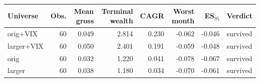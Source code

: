\begin{tabular}{lrrrrrrl}
\toprule
Universe & Obs. & Mean gross & Terminal wealth & CAGR & Worst month & ES$_{95}$ & Verdict \\
\midrule
orig+VIX & 60 & 0.049 & 2.814 & 0.230 & -0.062 & -0.046 & survived \\
larger+VIX & 60 & 0.050 & 2.401 & 0.191 & -0.059 & -0.048 & survived \\
orig & 60 & 0.032 & 1.220 & 0.041 & -0.078 & -0.067 & survived \\
larger & 60 & 0.038 & 1.180 & 0.034 & -0.070 & -0.061 & survived \\
\bottomrule
\end{tabular}
